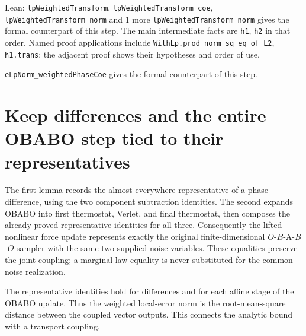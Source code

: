 \documentclass[11pt,a4paper]{article}
\begin{document}
\begin{leanbox}{Lean: \texttt{lpWeightedTransform}, \texttt{lpWeightedTransform\_\allowbreak{}coe}, \texttt{lpWeightedTransform\_\allowbreak{}norm} and 1 more}
\texttt{lp\allowbreak{}Weighted\allowbreak{}Transform\_\allowbreak{}norm} gives the formal counterpart of this step. The main intermediate facts are \texttt{h1}, \texttt{h2} in that order. Named proof applications include \texttt{With\allowbreak{}Lp.\allowbreak{}prod\_\allowbreak{}norm\_\allowbreak{}sq\_\allowbreak{}eq\_\allowbreak{}of\_\allowbreak{}L2}, \texttt{h1.\allowbreak{}trans}; the adjacent proof shows their hypotheses and order of use.




\texttt{e\allowbreak{}Lp\allowbreak{}Norm\_\allowbreak{}weighted\allowbreak{}Phase\allowbreak{}Coe} gives the formal counterpart of this step.
\end{leanbox}

\section{\texorpdfstring{Keep differences and the entire OBABO step tied to their representatives}{Keep differences and the entire OBABO step tied to their representatives}}


The first lemma records the almost-everywhere representative of a phase difference, using the two component subtraction identities. The second expands OBABO into first thermostat, Verlet, and final thermostat, then composes the already proved representative identities for all three. Consequently the lifted nonlinear force update represents exactly the original finite-dimensional \(O\)-\(B\)-A-\(B\)-\(O\) sampler with the same two supplied noise variables. These equalities preserve the joint coupling; a marginal-law equality is never substituted for the common-noise realization.



The representative identities hold for differences and for each affine stage of the OBABO update. Thus the weighted local-error norm is the root-mean-square distance between the coupled vector outputs. This connects the analytic bound with a transport coupling.
\end{document}
